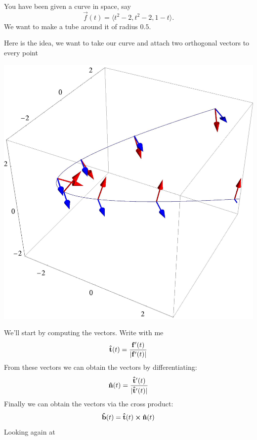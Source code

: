 \documentclass{ximera}
\begin{document}
\begin{example}
  You have been given a curve in space, say
  \[
  \vec{f}(t) = \langle t^2-2, t^2-2, 1-t\rangle.
  \]
  We want to make a tube around it of radius $0.5$.
  \begin{explanation}
    Here is the idea, we want to take our curve and attach two
    orthogonal vectors to every point
    \begin{image}
      \includegraphics{paraArrows.jpg}
    \end{image}
    We'll start by computing the
    vectors. Write with me
    \[
    \mathbf{\hat{t}}(t) = \frac{\mathbf{f}'(t)}{|\mathbf{f}'(t)|}
    \]
    From these vectors we can obtain the 
    vectors by differentiating:
    \[
    \mathbf{\hat{n}}(t) = \frac{\mathbf{\hat{t}}'(t)}{|\mathbf{\hat{t}}'(t)|}
    \]
    Finally we can obtain the 
    vectors via the cross product:
    \[
    \mathbf{\hat{b}}(t) = \mathbf{\hat{t}}(t) \boldsymbol\times \mathbf{\hat{n}}(t)
    \]
    Looking again at
    \begin{image}

\end{image}
\end{explanation}
\end{example}
\end{document}
